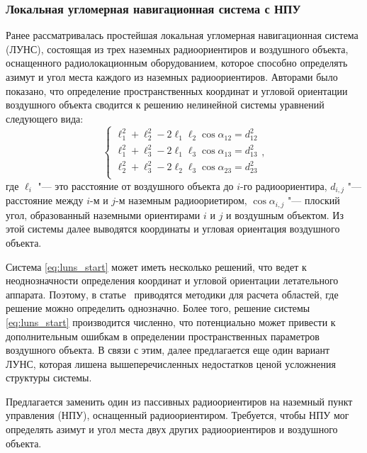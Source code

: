 \documentclass[../main.tex]{subfiles}
\begin{document}
\subsubsection{Локальная угломерная навигационная система с НПУ}
Ранее рассматривалась простейшая локальная угломерная навигационная система (ЛУНС), состоящая из трех наземных радиоориентиров и воздушного объекта, оснащенного радиолокационным оборудованием, которое способно определять азимут и угол места каждого из наземных радиоориентиров. Авторами было показано, что определение пространственных координат и угловой ориентации воздушного объекта сводится к решению нелинейной системы уравнений следующего вида:
\begin{equation}\label{eq:luns_start}
  \begin{cases}
    \ell_1^2 + \ell_2^2 - 2 \ell_1 \ell_2 \cos \alpha_{12} = d_{12}^2 \\
    \ell_1^2 + \ell_3^2 - 2 \ell_1 \ell_3 \cos \alpha_{13} = d_{13}^2 \\
    \ell_2^2 + \ell_3^2 - 2 \ell_2 \ell_3 \cos \alpha_{23} = d_{23}^2 \\
  \end{cases},
\end{equation}
где $\ell_i$ "--- это расстояние от воздушного объекта до $i$-го радиоориентира, $d_{i,j}$ "--- расстояние между $i$-м и $j$-м наземным радиоориетиром, $\cos \alpha_{i,j}$ "--- плоский угол, образованный наземными ориентирами $i$ и $j$ и воздушным объектом. Из этой системы далее выводятся координаты и угловая ориентация воздушного объекта.

Система \eqref{eq:luns_start} может иметь несколько решений, что ведет к неоднозначности определения координат и угловой ориентации летательного аппарата. Поэтому, в статье~\cite{antennas} приводятся методики для расчета областей, где решение можно определить однозначно. Более того, решение системы \eqref{eq:luns_start} производится численно, что потенциально может привести к дополнительным ошибкам в определении пространственных параметров воздушного объекта. В связи с этим, далее предлагается еще один вариант ЛУНС, которая лишена вышеперечисленных недостатков ценой усложнения структуры системы.

Предлагается заменить один из пассивных радиоориентиров на наземный пункт управления (НПУ), оснащенный радиоориентиром. Требуется, чтобы НПУ мог определять азимут и угол места двух других радиоориентиров и воздушного объекта.
\end{document}
